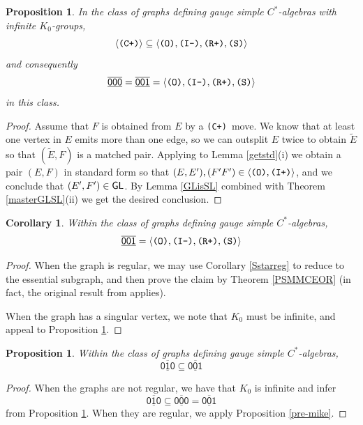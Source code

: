 \documentclass[12pt]{amsbook}%
\newtheorem{propo}[theor]{Proposition}
\newtheorem{corol}[theor]{Corollary}
\theoremstyle{defin}
\theoremstyle{remark}
\numberwithin{equation}{chapter}
\numberwithin{theor}{section}
\newcommand{\xyzrel}[1]{\mbox{$\overline{\underline{\mathsf{ #1}}}$}}
\newcommand{\IIIm}{\mbox{\texttt{\textup{(I-)}}}}
\newcommand{\IIIp}{\mbox{\texttt{\textup{(I+)}}}}
\newcommand{\OOO}{\mbox{\texttt{\textup{(O)}}}}
\newcommand{\CCCp}{\mbox{\texttt{\textup{(C+)}}}}
\newcommand{\RRRp}{\mbox{\texttt{\textup{(R+)}}}}
\newcommand{\SSS}{\mbox{\texttt{\textup{(S)}}}}
\newcommand{\GL}{{\sf GL}}
\begin{document}
\begin{propo}\label{simpleandinfK}
In the class of graphs defining gauge simple $C^*$-algebras with infinite $K_0$-groups,
\[
\langle \CCCp\rangle\subseteq \langle \OOO,\IIIm,\RRRp,\SSS\rangle
\]
and consequently
\[
\xyzrel{000}=\xyzrel{001}=\langle \OOO,\IIIm,\RRRp,\SSS\rangle
\]
in this class.
\end{propo}
\begin{proof}
Assume that $F$ is obtained from $E$ by a \CCCp\ move. We know that at least one vertex in $E$ emits more than one edge, so we can outsplit $E$ twice to obtain $\widetilde{E}$ so that $(\widetilde{E},F)$ is a matched pair. Applying to Lemma \ref{getstd}(i) we obtain a pair $(E,F)$ in standard form so that $(E,E'),(F'F')\in\langle \OOO,\IIIp\rangle$, and we conclude that $(E',F')\in\GL$.  By Lemma \ref{GLisSL} combined with Theorem \ref{masterGLSL}(ii) we get the desired conclusion.
\end{proof}





\begin{corol}\label{OOI-simple}
Within the class of  graphs defining gauge simple $C^*$-algebras, 
$$\xyzrel{001}=\langle \OOO,\IIIm,\RRRp,\SSS\rangle$$
\end{corol}
\begin{proof}
When the graph is regular, we may use Corollary \ref{Sstarreg} to reduce to the essential subgraph, and then prove the claim by Theorem \ref{PSMMCEOR} (in fact, the original result from \cite{kmhm:coetmscka} applies).


When the graph has a singular vertex, we note that $K_0$ must be infinite, and appeal to Proposition \ref{simpleandinfK}.
\end{proof}


\begin{propo}\label{OIOtoOOI}
Within the class of  graphs defining gauge simple $C^*$-algebras, 
$$\xyzrel{010}\subseteq \xyzrel{001}$$
\end{propo}
\begin{proof}
When the graphs are not regular, we have that $K_0$ is infinite and infer
\[
\xyzrel{010}\subseteq \xyzrel{000}=\xyzrel{001}
\]
from Proposition \ref{simpleandinfK}. When they are regular, we apply Proposition \ref{pre-mike}.
\end{proof}
\end{document}

